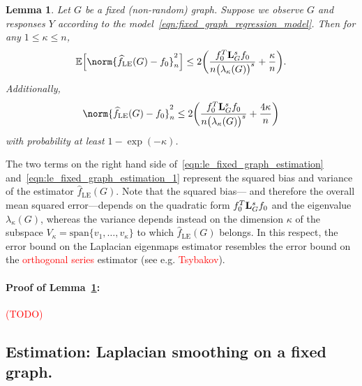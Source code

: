 \documentclass{article}
\newcommand{\1}{\mathbf{1}}
\newcommand{\Lap}{{\bf L}}
\newcommand{\Ebb}{\mathbb{E}}
\newcommand{\wh}[1]{\widehat{#1}}
\newcommand{\LE}{\mathrm{LE}}
\theoremstyle{alden}
\theoremstyle{aldenthm}
\newtheorem{lemma}{Lemma}
\theoremstyle{definition}
\theoremstyle{remark}
\begin{document}
\begin{lemma}
	\label{lem:le_fixed_graph_estimation}
	Let $G$ be a fixed (non-random) graph. Suppose we observe $G$ and responses $Y$ according to the model~\eqref{eqn:fixed_graph_regression_model}. Then for any $1 \leq \kappa \leq n$, 
	\begin{equation}
	\label{eqn:le_fixed_graph_estimation}
	\Ebb\Bigl[\norm{\wh{f}_{\LE}(G) - f_0}_n^2\Bigr] \leq 2\biggl(\frac{f_0^T \Lap_{G}^s f_0}{n \bigl(\lambda_{\kappa}(G)\bigr)^s} + \frac{\kappa}{n}\biggr).
	\end{equation}
	Additionally, 
	\begin{equation}
	\label{eqn:le_fixed_graph_estimation_1}
	\norm{\wh{f}_{\LE}(G) - f_0}_n^2 \leq 2\biggl(\frac{f_0^T \Lap_{G}^s f_0}{n \bigl(\lambda_{\kappa}(G)\bigr)^s} + \frac{4\kappa}{n}\biggr)
	\end{equation}
	with probability at least $1 - \exp(-\kappa)$.
\end{lemma}
The two terms on the right hand side of~\eqref{eqn:le_fixed_graph_estimation} and~\eqref{eqn:le_fixed_graph_estimation_1} represent the squared bias and variance of the estimator $\wh{f}_{\LE}(G)$. Note that the squared bias--- and therefore the overall mean squared error---depends on the quadratic form $f_0^T \Lap_{G}^s f_0$ and the eigenvalue $\lambda_{\kappa}(G)$, whereas the variance depends instead on the dimension $\kappa$ of the subspace $V_{\kappa} = \textrm{span}\{v_1,\ldots,v_{\kappa}\}$ to which $\wh{f}_{\LE}(G)$ belongs. In this respect, the error bound on the Laplacian eigenmaps estimator resembles the error bound on the \textcolor{red}{orthogonal series} estimator (see e.g. \textcolor{red}{Tsybakov}).

\paragraph{Proof of Lemma~\ref{lem:le_fixed_graph_estimation}:}

\textcolor{red}{(TODO)}

\subsection{Estimation: Laplacian smoothing on a fixed graph.}
\end{document}
